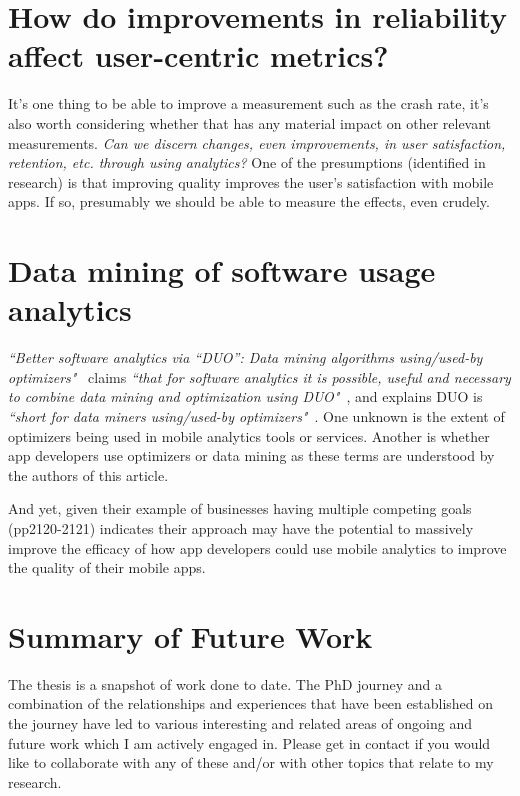 \section{How do improvements in reliability affect user-centric metrics?}
It's one thing to be able to improve a measurement such as the crash rate, it's also worth considering whether that has any material impact on other relevant measurements. \emph{Can we discern changes, even improvements, in user satisfaction, retention, etc. through using analytics?} One of the presumptions (identified in research) is that improving quality improves the user's satisfaction with mobile apps. If so, presumably we should be able to measure the effects, even crudely.

\section{Data mining of software usage analytics}
\emph{``Better software analytics via “DUO”: Data mining algorithms using/used-by optimizers"}~\citep{agrawal2020_better_software_analytics_via_duo} claims \emph{``that for software analytics it is possible, useful and necessary to combine data mining and optimization using DUO"}~\citep[p.2099]{agrawal2020_better_software_analytics_via_duo}, and explains DUO is \emph{``short for data miners using/used-by optimizers"}~\citep[p.2100]{agrawal2020_better_software_analytics_via_duo}. One unknown is the extent of optimizers being used in mobile analytics tools or services. Another is whether app developers use optimizers or data mining as these terms are understood by the authors of this article. 

And yet, given their example of businesses having multiple competing goals (pp2120-2121) indicates their approach may have the potential to massively improve the efficacy of how app developers could use mobile analytics to improve the quality of their mobile apps. 


\section{Summary of Future Work}
The thesis is a snapshot of work done to date. The PhD journey and a combination of the relationships and experiences that have been established on the journey have led to various interesting and related areas of ongoing and future work which I am actively engaged in. Please get in contact if you would like to collaborate with any of these and/or with other topics that relate to my research.
